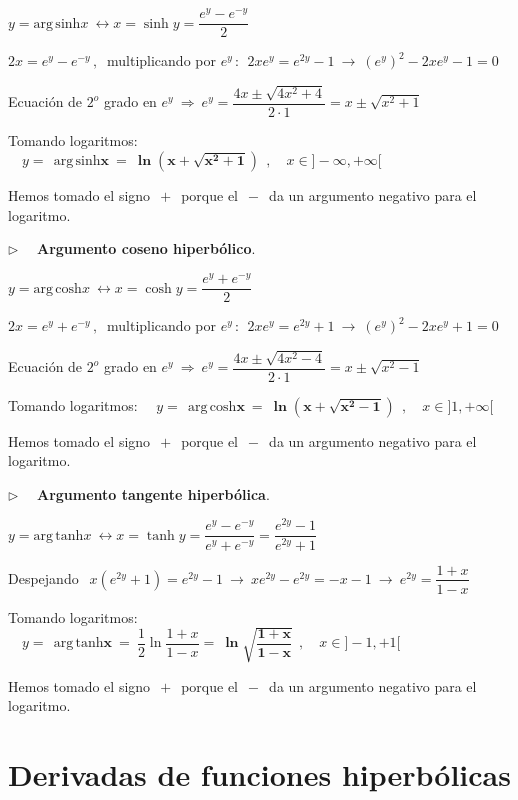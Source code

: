$y=\mathrm{arg\, sinh} x \ \leftrightarrow x=\sinh y=\dfrac{e^y-e^{-y}}{2}$

$2x=e^y-e^{-y}\, , \  $ multiplicando por $e^y\, : \ \ 2xe^y=e^{2y}-1 \ \to \ (e^y)^2-2xe^y-1=0$ 

Ecuación de $2^o$ grado en $e^y \ \Rightarrow \ e^y=\dfrac{4x\pm \sqrt{4x^2+4}}{2\cdot 1}=x\pm \sqrt{x^2+1}$

Tomando logaritmos: $\quad y = \ \boxed{ \ \boldsymbol{\mathrm{arg\, sinh} x\ = \ \ln \left( x+\sqrt{x^2+1} \right) } \ } \ , \quad x\in ]-\infty,+\infty[$

Hemos tomado el signo $\, + \, $ porque el $\, - \, $ da un argumento negativo para el logaritmo.

\vspace{5mm}$\triangleright \quad$ \textbf{Argumento coseno hiperbólico}.

$y=\mathrm{arg\, cosh} x \ \leftrightarrow x=\cosh y=\dfrac{e^y+e^{-y}}{2}$

$2x=e^y+e^{-y}\, , \  $ multiplicando por $e^y\, : \ \ 2xe^y=e^{2y}+1 \ \to \ (e^y)^2-2xe^y+1=0$ 

Ecuación de $2^o$ grado en $e^y \ \Rightarrow \ e^y=\dfrac{4x\pm \sqrt{4x^2-4}}{2\cdot 1}=x\pm \sqrt{x^2-1}$

Tomando logaritmos: $\quad y = \ \boxed{ \ \boldsymbol{\mathrm{arg\, cosh} x\ = \ \ln \left( x+\sqrt{x^2-1} \right) } \ } \ , \quad x\in ]1,+\infty[$

Hemos tomado el signo $\, + \, $ porque el $\, - \, $ da un argumento negativo para el logaritmo.

\vspace{5mm}$\triangleright \quad$ \textbf{Argumento tangente hiperbólica}.

$y=\mathrm{arg\, tanh} x \ \leftrightarrow x=\tanh y=\dfrac{e^y-e^{-y}}{e^y+e^{-y}}=\dfrac{e^{2y}-1}{e^{2y}+1}$

Despejando $\ \ x(e^{2y}+1)=e^{2y}-1 \ \to \ xe^{2y}-e^{2y}=-x-1 \ \to \ e^{2y}=\dfrac{1+x}{1-x}$ 

Tomando logaritmos: $\quad y = \ \boxed{ \ \boldsymbol{\mathrm{arg\, tanh} x }\ = \ \dfrac 1 2 \ln \dfrac {1+x}{1-x} =\ \boldsymbol{ \ln \sqrt{\dfrac {1+x}{1-x}  } } \ } \ , \quad x\in ]-1,+1[$

Hemos tomado el signo $\, + \, $ porque el $\, - \, $ da un argumento negativo para el logaritmo.


\vspace{1cm}
\section{Derivadas de funciones hiperbólicas}
\vspace{0.5cm}

